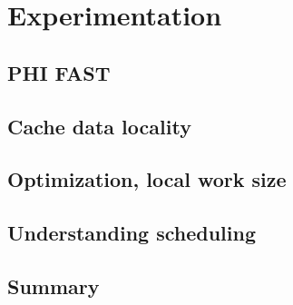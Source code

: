 \chapter{Experimentation}
\label{cha:exp1}

\section{PHI FAST}

\section{Cache data locality}

\section{Optimization, local work size}

\section{Understanding scheduling}

\section{Summary}
